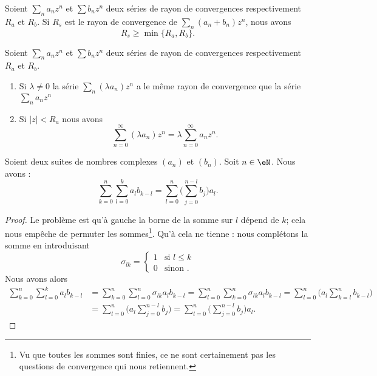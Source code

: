 \begin{theorem}\label{THOooSDQQooIawBOk}
	Soient \( \sum_na_nz^n\) et \( \sum b_nz^n\) deux séries de rayon de convergences respectivement \( R_a\) et \( R_b\).  Si \( R_s\) est le rayon de convergence de \( \sum_n(a_n+b_n)z^n\), nous avons
	\begin{equation}
		R_s\geq \min\{ R_a,R_b \}.
	\end{equation}
\end{theorem}

\begin{theorem}     \label{THOooINHDooZxErnp}
	Soient \( \sum_na_nz^n\) et \( \sum b_nz^n\) deux séries de rayon de convergences respectivement \( R_a\) et \( R_b\).
	\begin{enumerate}
		\item
		      Si \( \lambda\neq 0\) la série \( \sum_n(\lambda a_n)z^n\) a le même rayon de convergence que la série \( \sum_na_nz^n\)
		\item
		      Si \( | z |<R_a\) nous avons
		      \begin{equation}
			      \sum_{n=0}^{\infty}(\lambda a_n)z^n=\lambda\sum_{n=0}^{\infty}a_nz^n.
		      \end{equation}
	\end{enumerate}
\end{theorem}


\begin{lemma}       \label{LEMooNYAXooKUuQFe}
	Soient deux suites de nombres complexes \( (a_n)\) et \( (b_n)\). Soit \( n\in \eN\). Nous avons :
	\begin{equation}
		\sum_{k=0}^n\sum_{l=0}^ka_lb_{k-l}=\sum_{l=0}^n\big( \sum_{j=0}^{n-l}b_j \big)a_l.
	\end{equation}
\end{lemma}

\begin{proof}
	Le problème est qu'à gauche la borne de la somme sur \( l\) dépend de \( k\); cela nous empêche de permuter les sommes\footnote{Vu que toutes les sommes sont finies, ce ne sont certainement pas les questions de convergence qui nous retiennent.}. Qu'à cela ne tienne : nous complétons la somme en introduisant
	\begin{equation}
		\sigma_{lk}=\begin{cases}
			1 & \text{si } l\leq k \\
			0 & \text{sinon }.
		\end{cases}
	\end{equation}
	Nous avons alors
	\begin{subequations}
		\begin{align}
			\sum_{k=0}^n\sum_{l=0}^ka_lb_{k-l} & =\sum_{k=0}^n\sum_{l=0}^n\sigma_{lk}a_lb_{k-l}=\sum_{l=0}^n\sum_{k=0}^n\sigma_{lk}a_lb_{k-l} =\sum_{l=0}^n\big( a_l\sum_{k=l}^nb_{k-l} \big) \\
			                                   & =\sum_{l=0}^n\big( a_l\sum_{j=0}^{n-l}b_j \big)=\sum_{l=0}^n\big( \sum_{j=0}^{n-l}b_j \big)a_l.
		\end{align}
	\end{subequations}
\end{proof}

